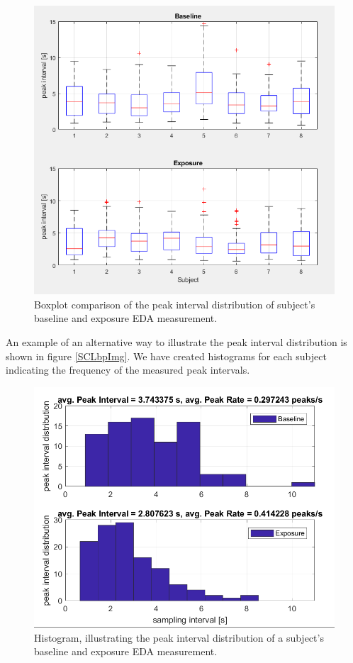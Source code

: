 \begin{figure}[h]
\centering
\includegraphics[width=1\textwidth]{images/EDApid.png}
\caption{Boxplot comparison of the peak interval distribution of subject's baseline and exposure EDA measurement.}
\label{EDAbpImg}
\end{figure}

\newpage
An example of an alternative way to illustrate the peak interval distribution is shown in figure \ref{SCLbpImg}. We have created histograms for each subject indicating the frequency of the measured peak intervals. 

\begin{figure}[h]
\centering
\includegraphics[width=1\textwidth]{images/EDAhisto.png}
\caption{Histogram, illustrating the peak interval distribution of a subject's baseline and exposure EDA measurement.}
\label{EDAhistoImg}
\end{figure}

